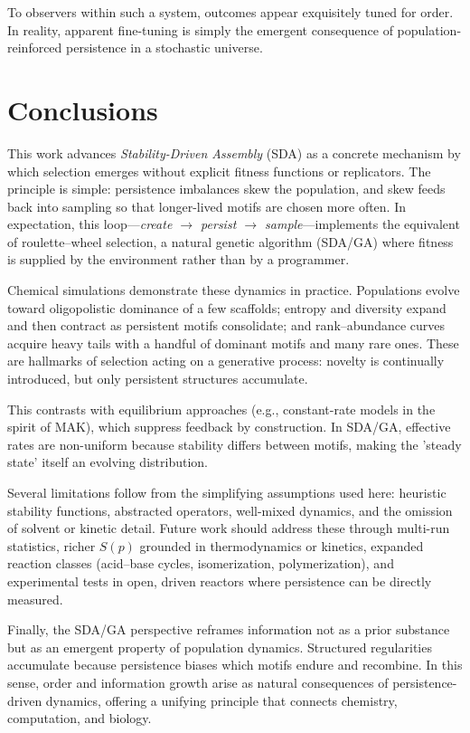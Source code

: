 \documentclass[life,article,submit,pdftex,moreauthors]{Definitions/mdpi}
\begin{document}
To observers within such a system, outcomes appear exquisitely tuned for order. 
In reality, apparent fine-tuning is simply the emergent consequence of population-reinforced persistence in a stochastic universe.  


\section{Conclusions}

This work advances \textit{Stability-Driven Assembly} (SDA) as a concrete mechanism by which selection emerges without explicit fitness functions or replicators. The principle is simple: persistence imbalances skew the population, and skew feeds back into sampling so that longer-lived motifs are chosen more often. In expectation, this loop—\emph{create $\rightarrow$ persist $\rightarrow$ sample}—implements the equivalent of roulette–wheel selection, a natural genetic algorithm (SDA/GA) where fitness is supplied by the environment rather than by a programmer.  

Chemical simulations demonstrate these dynamics in practice. Populations evolve toward oligopolistic dominance of a few scaffolds; entropy and diversity expand and then contract as persistent motifs consolidate; and rank–abundance curves acquire heavy tails with a handful of dominant motifs and many rare ones. These are hallmarks of selection acting on a generative process: novelty is continually introduced, but only persistent structures accumulate.  

This contrasts with equilibrium approaches (e.g., constant-rate models in the spirit of MAK), which suppress feedback by construction. In SDA/GA, effective rates are non-uniform because stability differs between motifs, making the 'steady state' itself an evolving distribution.  

Several limitations follow from the simplifying assumptions used here: heuristic stability functions, abstracted operators, well-mixed dynamics, and the omission of solvent or kinetic detail. Future work should address these through multi-run statistics, richer $S(p)$ grounded in thermodynamics or kinetics, expanded reaction classes (acid–base cycles, isomerization, polymerization), and experimental tests in open, driven reactors where persistence can be directly measured.  

Finally, the SDA/GA perspective reframes information not as a prior substance but as an emergent property of population dynamics. Structured regularities accumulate because persistence biases which motifs endure and recombine. In this sense, order and information growth arise as natural consequences of persistence-driven dynamics, offering a unifying principle that connects chemistry, computation, and biology.  
\end{document}
